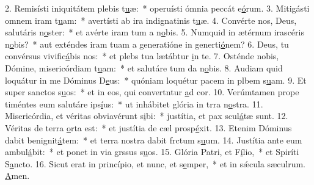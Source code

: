 2. Remisísti iniquitátem plebis t\uline{u}æ:~* operuísti ómnia peccát e\uline{ó}rum.
3. Mitigásti omnem iram t\uline{u}am:~* avertísti ab ira indignatinis t\uline{u}æ.
4. Convérte nos, Deus, salutáris n\uline{o}ster:~* et avérte iram tum a n\uline{o}bis.
5. Numquid in ætérnum irascéris n\uline{o}bis?~* aut exténdes iram tuam a generatióne in generti\uline{ó}nem?
6. Deus, tu convérsus vivific\uline{á}bis nos:~* et plebs tua lætábtur \uline{i}n te.
7. Osténde nobis, Dómine, misericórdiam t\uline{u}am:~* et salutáre tum da n\uline{o}bis.
8. Audiam quid loquátur in me Dóminus D\uline{e}us:~* quóniam loquétur pacem in plbem s\uline{u}am.
9. Et super sanctos s\uline{u}os:~* et in eos, qui convertntur \uline{a}d cor.
10. Verúmtamen prope timéntes eum salutáre ips\uline{í}us:~* ut inhábitet glória in trra n\uline{o}stra.
11. Misericórdia, et véritas obviavérunt s\uline{i}bi:~* justítia, et pax scul\uline{á}tæ sunt.
12. Véritas de terra \uline{o}rta est:~* et justítia de cæl prosp\uline{é}xit.
13. Etenim Dóminus dabit benignit\uline{á}tem:~* et terra nostra dabit frctum s\uline{u}um.
14. Justítia ante eum ambul\uline{á}bit:~* et ponet in via grssus s\uline{u}os.
15. Glória Patri, et F\uline{í}lio,~* et Spiríti S\uline{a}ncto.
16. Sicut erat in princípio, et nunc, et s\uline{e}mper,~* et in sǽcula sæculrum. \uline{A}men.
